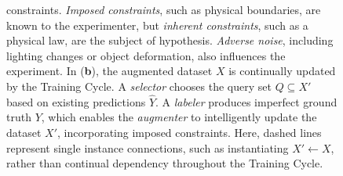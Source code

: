 \documentclass[twocolumn, 10pt]{asme2ej}
\begin{document}
\begin{figure}
{    constraints. \textit{Imposed constraints}, such as physical boundaries, are
    known to the experimenter, but \textit{inherent constraints}, such as a
    physical law, are the subject of hypothesis. \textit{Adverse noise},
    including lighting changes or object deformation, also influences the
    experiment. In (\textbf{b}), the augmented dataset $X$ is continually
    updated by the Training Cycle. A \textit{selector} chooses the query set
    $Q \subseteq X'$ based on existing predictions $\hat{Y}$. A \textit{labeler}
    produces imperfect ground truth $Y$, which enables the \textit{augmenter} to
    intelligently update the dataset $X'$, incorporating imposed
    constraints. Here, dashed lines represent single instance connections, such
    as instantiating $X' \gets X$, rather than continual dependency throughout
    the Training Cycle.}
  \label{fig:dependency-graphs}
\end{figure}



\end{document}

